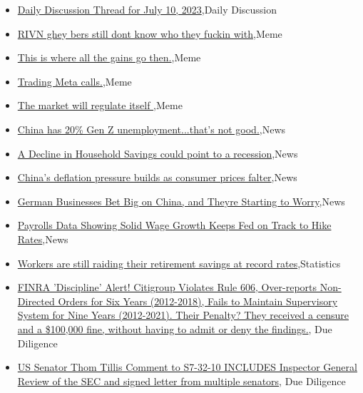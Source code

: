 \documentclass{article}%
\begin{document}
%
\begin{itemize}%
\item%
\href{https://reddit.com/r/wallstreetbets/comments/14vpnex/daily\_discussion\_thread\_for\_july\_10\_2023/}{Daily Discussion Thread for July 10, 2023},Daily Discussion%
\item%
\href{https://reddit.com/r/wallstreetbets/comments/14vmgnu/rivn\_ghey\_bers\_still\_dont\_know\_who\_they\_fuckin/}{RIVN ghey bers still dont know who they fuckin with},Meme%
\item%
\href{https://reddit.com/r/wallstreetbets/comments/14vjxqh/this\_is\_where\_all\_the\_gains\_go\_then/}{This is where all the gains go then.},Meme%
\item%
\href{https://reddit.com/r/wallstreetbets/comments/14vjox7/trading\_meta\_calls/}{Trading Meta calls.},Meme%
\item%
\href{https://reddit.com/r/StockMarket/comments/14v770j/the\_market\_will\_regulate\_itself/}{The market will regulate itself },Meme%
\item%
\href{https://reddit.com/r/StockMarket/comments/14uig3t/china\_has\_20\_gen\_z\_unemploymentthats\_not\_good/}{China has 20\% Gen Z unemployment...that's not good.},News%
\item%
\href{https://reddit.com/r/StockMarket/comments/14uassg/a\_decline\_in\_household\_savings\_could\_point\_to\_a/}{A Decline in Household Savings could point to a recession},News%
\item%
\href{https://reddit.com/r/Economics/comments/14vopuo/chinas\_deflation\_pressure\_builds\_as\_consumer/}{China's deflation pressure builds as consumer prices falter},News%
\item%
\href{https://reddit.com/r/Economics/comments/14vgwse/german\_businesses\_bet\_big\_on\_china\_and\_theyre/}{German Businesses Bet Big on China, and Theyre Starting to Worry},News%
\item%
\href{https://reddit.com/r/Economics/comments/14vde4m/payrolls\_data\_showing\_solid\_wage\_growth\_keeps\_fed/}{Payrolls Data Showing Solid Wage Growth Keeps Fed on Track to Hike Rates},News%
\item%
\href{https://reddit.com/r/Economics/comments/14v6iro/workers\_are\_still\_raiding\_their\_retirement/}{Workers are still raiding their retirement savings at record rates},Statistics%
\item%
\href{https://reddit.com/r/Superstonk/comments/14vsy3s/finra\_discipline\_alert\_citigroup\_violates\_rule/}{FINRA 'Discipline' Alert! Citigroup Violates Rule 606, Over-reports Non-Directed Orders for Six Years (2012-2018), Fails to Maintain Supervisory System for Nine Years (2012-2021). Their Penalty? They received a censure and a \$100,000 fine, without having to admit or deny the findings.}, Due Diligence%
\item%
\href{https://reddit.com/r/Superstonk/comments/14vsci1/us\_senator\_thom\_tillis\_comment\_to\_s73210\_includes/}{US Senator Thom Tillis Comment to S7-32-10 INCLUDES Inspector General Review of the SEC and signed letter from multiple senators}, Due Diligence%
\end{itemize}%
\end{document}
